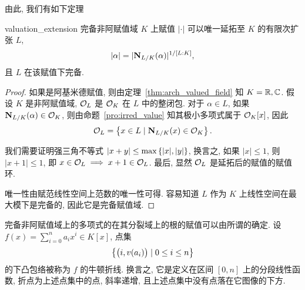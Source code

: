 由此, 我们有如下定理
\begin{theorem}{}{valuation_extension}
完备非阿赋值域 $K$ 上赋值 $|\cdot|$ 可以唯一延拓至 $K$ 的有限次扩张 $L$,
  \[|\alpha|=|{\mathbf{N}}_{L/K}(\alpha)|^{1/[L:K]},\]
且 $L$ 在该赋值下完备.
\end{theorem}
\begin{proof}
如果是阿基米德赋值, 则由定理~\ref{thm:arch_valued_field} 知 $K={\mathbb{R}},{\mathbb{C}}$. 假设 $K$ 是非阿赋值域, ${\mathcal{O}}_L$ 是 ${\mathcal{O}}_K$ 在 $L$ 中的整闭包. 对于 $\alpha\in L$, 如果 ${\mathbf{N}}_{L/K}(\alpha)\in {\mathcal{O}}_K$, 则由命题~\ref{pro:irred_value} 知其极小多项式属于 ${\mathcal{O}}_K[x]$, 因此 
  \[{\mathcal{O}}_L=\left\{x\in L\mid {\mathbf{N}}_{L/K}(x)\in{\mathcal{O}}_K\right\}.\]

我们需要证明强三角不等式 $|x+y|\le \max\left\{|x|,|y|\right\}$, 换言之, 如果 $|x|\le 1$, 则 $|x+1|\le 1$, 即 $x\in{\mathcal{O}}_L\implies x+1\in{\mathcal{O}}_L$. 最后, 显然 ${\mathcal{O}}_L$ 是延拓后的赋值的赋值环.

唯一性由赋范线性空间上范数的唯一性可得. 容易知道 $L$ 作为 $K$ 上线性空间在最大模下是完备的, 因此它是完备赋值域.
\end{proof}

完备非阿赋值域上的多项式的在其分裂域上的根的赋值可以由所谓的确定.
设 $f(x)=\sum_{i=0}^na_ix^i\in K[x]$, 点集 
	\[\left\{\bigl(i,v(a_i)\bigr)\mid 0\le i\le n\right\}\]
的下凸包络被称为 $f$ 的牛顿折线. 换言之, 它是定义在区间 $[0,n]$ 上的分段线性函数, 折点为上述点集中的点, 斜率递增, 且上述点集中没有点落在它图像的下方.

